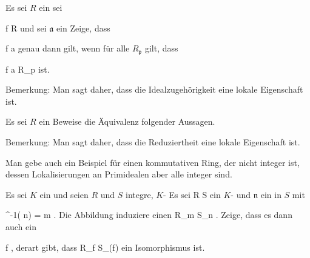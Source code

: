 {}
{





Es sei $R$ ein
sei

\mavergleichskette
{\vergleichskette
{f
}
{ \in }{ R
}
{  }{
}
{    }{
}
{   }{
}
}
{}{}{}
und sei ${\mathfrak a}$ ein
Zeige, dass

\mavergleichskette
{\vergleichskette
{f
}
{ \in }{ {\mathfrak a}
}
{  }{
}
{    }{
}
{   }{
}
}
{}{}{}
genau dann gilt, wenn für alle
$R_{\mathfrak p}$ gilt, dass

\mavergleichskette
{\vergleichskette
{f
}
{ \in }{ {\mathfrak a} R_{\mathfrak p}
}
{  }{
}
{    }{
}
{   }{
}
}
{}{}{}
ist.





}
{Bemerkung: Man sagt daher, dass die Idealzugehörigkeit eine lokale Eigenschaft ist.} {}

{}
{





Es sei $R$ ein
Beweise die Äquivalenz folgender Aussagen.





}
{Bemerkung: Man sagt daher, dass die Reduziertheit eine lokale Eigenschaft ist.

Man gebe auch ein Beispiel für einen kommutativen Ring, der nicht integer ist, dessen Lokalisierungen an Primidealen aber alle integer sind.} {}

{}
{





Es sei $K$ ein
und seien $R$ und $S$ integre,
$K$-
Es sei
\maabbdisp {\varphi} { R } { S
} {}
ein
$K$-
und ${\mathfrak n}$ ein
in $S$ mit

\mavergleichskette
{\vergleichskette
{ \varphi^{-1}( {\mathfrak n})
}
{ = }{ {\mathfrak m}
}
{  }{
}
{    }{
}
{   }{
}
}
{}{}{.}
Die Abbildung induziere einen
\maabb {} { R_{\mathfrak m} } { S_{\mathfrak n}
} {.}
Zeige, dass es dann auch ein

 {}
 {f \not {}} {}
 {} {} {} {,}
derart gibt, dass
\maabb {} { R_f } { S_{\varphi (f)}
} {}
ein Isomorphismus ist.





}
{} {}

